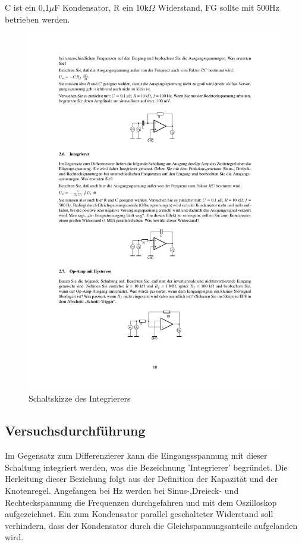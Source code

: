 \documentclass[12pt,a4paper]{article}
\begin{document}
C ist ein 0,1$\mu$F Kondensator, R ein 10k$\Omega$ Widerstand, FG sollte mit 500Hz betrieben werden.

\begin{figure}[H] 
  \centering
    \includegraphics[trim = 10mm 105mm 10mm 160mm, clip, scale = 1]{ep4_14[Page10].pdf}
  	\caption[Schaltskizze des Integrierers]{Schaltskizze des Integrierers\footnotemark}
  \label{fig:1}
\end{figure}

\subsection{Versuchsdurchführung}
Im Gegensatz zum Differenzierer kann die Eingangsspannung mit dieser Schaltung integriert werden, was die Bezeichnung 'Integrierer' begründet. Die Herleitung dieser Beziehung folgt aus der Definition der Kapazität und der Knotenregel. Angefangen bei \unit[500]{Hz} werden bei Sinus-,Dreieck- und Rechteckspannung die Frequenzen durchgefahren und mit dem Oszilloskop aufgezeichnet. Ein zum Kondensator parallel geschalteter Widerstand soll verhindern, dass der Kondensator durch die Gleichspannungsanteile aufgelanden wird.
\end{document}
